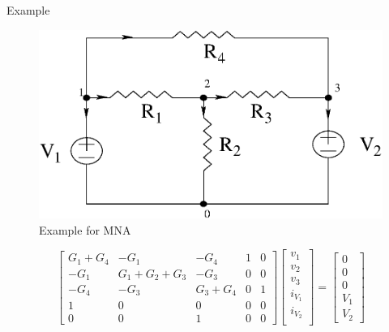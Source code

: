 \documentclass{beamer}
\begin{document}
\begin{frame}
\begin{block}{Example}
\begin{figure}[!ht]
\begin{center}
\includegraphics[scale=0.35]{../figures/modified_figure.eps}
\caption{ Example for MNA } \label{modifiedfig}
\end{center}
\end{figure}
\begin{tiny}
$$\left[
\begin{array}{cccccc}
G_{1}+G_{4} & -G_{1} & -G_{4} & 1 & 0 \\
-G_{1} & G_{1}+G_{2}+G_{3} & -G_{3} & 0 & 0 \\
-G_{4} & -G_{3} & G_{3}+G_{4} & 0 & 1  \\
1 & 0 & 0 & 0 & 0 \\
0 & 0 & 1 & 0 & 0
\end{array}
\right] \left[
\begin{array}{c}
v_{1}\\
v_{2}\\
v_{3}\\
i_{V_1}\\
i_{V_2}\\
\end{array}
\right]= \left[
\begin{array}{c}
0\\
0\\
0\\
V_{1}\\
V_{2}
\end{array}
\right]$$
\end{tiny}
\end{block}
\end{frame}
\end{document}

